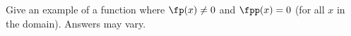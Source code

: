 {Give an example of a function where $\fp(x) \neq 0$ and $\fpp(x) = 0$ (for all $x$ in the domain).
}
{Answers may vary.
}
